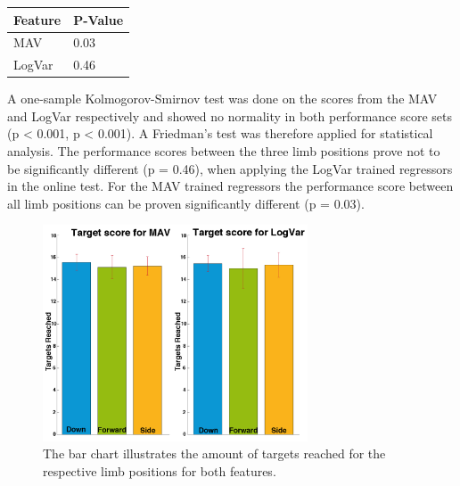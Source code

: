 	\begin{center}
		\begin{tabular}{l l}
			\toprule
			\textbf{Feature} & \textbf{P-Value}\\
			\midrule
			MAV & 0.03 \\
			LogVar & 0.46 \\
			\bottomrule
		\end{tabular}
	\end{center}

A one-sample Kolmogorov-Smirnov test was done on the scores from the MAV and LogVar respectively and showed no normality in both performance score sets (p < 0.001, p < 0.001). A Friedman's test was therefore applied for statistical analysis. The performance scores between the three limb positions prove not to be significantly different (p = 0.46), when applying the LogVar trained regressors in the online test. For the MAV trained regressors the performance score between all limb positions can be proven significantly different (p = 0.03). 

\begin{figure}[H]
	\includegraphics[width=0.7\textwidth]{figures/results/TargetsReached}  %
	\caption{The bar chart illustrates the amount of targets reached for the respective limb positions for both features.}
	\label{fig:TargetsReached}  %
\end{figure}

